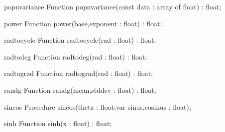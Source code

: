 \FPCexample{}


\begin{function}{popnvariance}
\Declaration
Function popnvariance(const data : array of float) : float;
\Description

\Errors
\SeeAlso
\end{function}

\FPCexample{}


\begin{function}{power}
\Declaration
Function power(base,exponent : float) : float;
\Description

\Errors
\SeeAlso
\end{function}

\FPCexample{}


\begin{function}{radtocycle}
\Declaration
Function radtocycle(rad : float) : float;
\Description

\Errors
\SeeAlso
\end{function}

\FPCexample{}


\begin{function}{radtodeg}
\Declaration
Function radtodeg(rad : float) : float;
\Description

\Errors
\SeeAlso
\end{function}

\FPCexample{}


\begin{function}{radtograd}
\Declaration
Function radtograd(rad : float) : float;
\Description

\Errors
\SeeAlso
\end{function}

\FPCexample{}


\begin{function}{randg}
\Declaration
Function randg(mean,stddev : float) : float;
\Description

\Errors
\SeeAlso
\end{function}

\FPCexample{}


\begin{procedure}{sincos}
\Declaration
Procedure sincos(theta : float;var sinus,cosinus : float);
\Description

\Errors
\SeeAlso
\end{procedure}

\FPCexample{}


\begin{function}{sinh}
\Declaration
Function sinh(x : float) : float;
\Description

\Errors
\SeeAlso
\end{function}

